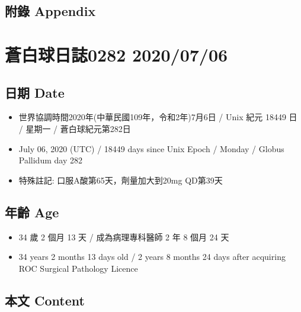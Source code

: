 \documentclass[a5paper, 11pt
]{book}
\providecommand{\tightlist}{%
  \setlength{\itemsep}{0pt}\setlength{\parskip}{0pt}}
\begin{document}
\hypertarget{ux9644ux9304-appendix-34}{%
\subsection{附錄 Appendix}\label{ux9644ux9304-appendix-34}}

\hypertarget{ux84bcux767dux7403ux65e5ux8a8c0282-20200706}{%
\section{蒼白球日誌0282
2020/07/06}\label{ux84bcux767dux7403ux65e5ux8a8c0282-20200706}}

\hypertarget{ux65e5ux671f-date-35}{%
\subsection{日期 Date}\label{ux65e5ux671f-date-35}}

\begin{itemize}
\tightlist
\item
  世界協調時間2020年(中華民國109年，令和2年)7月6日 / Unix 紀元 18449 日
  / 星期一 / 蒼白球紀元第282日
\item
  July 06, 2020 (UTC) / 18449 days since Unix Epoch / Monday / Globus
  Pallidum day 282
\item
  特殊註記: 口服A酸第65天，劑量加大到20mg QD第39天
\end{itemize}

\hypertarget{ux5e74ux9f61-age-35}{%
\subsection{年齡 Age}\label{ux5e74ux9f61-age-35}}

\begin{itemize}
\tightlist
\item
  34 歲 2 個月 13 天 / 成為病理專科醫師 2 年 8 個月 24 天
\item
  34 years 2 months 13 days old / 2 years 8 months 24 days after
  acquiring ROC Surgical Pathology Licence
\end{itemize}

\hypertarget{ux672cux6587-content-35}{%
\subsection{本文 Content}\label{ux672cux6587-content-35}}
\end{document}
